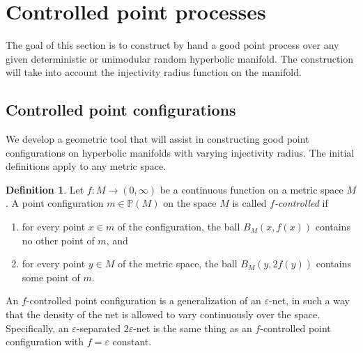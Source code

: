 \documentclass{amsart}
\newcommand{\Points}{\mathbb{P}}
\theoremstyle{plain}
\newtheorem{lemma}[theorem]{Lemma}
\numberwithin{equation}{section}
\theoremstyle{definition}
\newtheorem{definition}[theorem]{Definition}
\begin{document}
\section{Controlled point processes}
\label{sec:controlled point process}

The goal of this section is to construct by hand a good point process over any given deterministic  or  unimodular random hyperbolic manifold. The construction will take into account the injectivity radius function on the manifold.

\subsection{Controlled point configurations}

We develop a geometric tool that will assist in constructing good point configurations on hyperbolic manifolds with varying injectivity radius. The initial definitions apply to any metric space.


\begin{definition}
\label{def:controlled point}
Let $f : M \to \left(0,\infty\right) $ be a continuous function on a metric space $M$. 
A point configuration $m \in \Points(M)$ on the space $M$ is called  \emph{$f$-controlled} if
\begin{enumerate}[label =(\arabic*)]
    \item for every point $ x \in m$ of the configuration, the ball $B_M(x,f(x))$ contains no other point of $m$, and
    \item for every point $y \in M$ of the metric space, the ball $B_M(y,2 f(y))$ contains some  point of $m$.
\end{enumerate}
\end{definition}

An $f$-controlled point configuration is a generalization of an $\varepsilon$-net, in such a way that the density of the net is allowed to vary continuously over the space. Specifically, an $\varepsilon$-separated $2\varepsilon$-net is the same thing as an $f$-controlled point configuration with $f = \varepsilon$ constant. 

\end{document}

